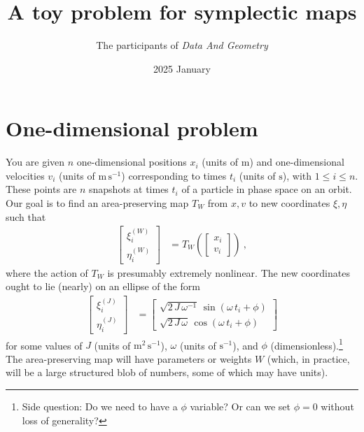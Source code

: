 \documentclass{article}
\title{\bfseries%
A toy problem for symplectic maps}
\author{The participants of \textsl{Data And Geometry}}
\date{2025 January}
\newcommand{\unit}[1]{\mathrm{#1}}
\newcommand{\m}{\unit{m}}
\newcommand{\s}{\unit{s}}
\newcommand{\ps}{\s^{-1}}
\newcommand{\mps}{\m\,\ps}
\newcommand{\mmps}{\m^2\,\ps}
\begin{document}
\maketitle

\section{One-dimensional problem}
You are given $n$ one-dimensional positions $x_i$ (units of $\m$) and one-dimensional velocities $v_i$ (units of $\mps$) corresponding to times $t_i$ (units of $\s$), with $1\leq i\leq n$.
These points are $n$ snapshots at times $t_i$ of a particle in phase space on an orbit.
Our goal is to find an area-preserving map $T_W$ from $x, v$ to new coordinates $\xi, \eta$ such that
\begin{align}
    \begin{bmatrix}\xi^{(W)}_i \\ \eta^{(W)}_i\end{bmatrix} &= T_W\left(\begin{bmatrix}x_i \\ v_i\end{bmatrix}\right) ~,
\end{align}
where the action of $T_W$ is presumably extremely nonlinear.
The new coordinates ought to lie (nearly) on an ellipse of the form
\begin{align}
    \begin{bmatrix}\xi^{(J)}_i \\ \eta^{(J)}_i\end{bmatrix} &= \begin{bmatrix}\sqrt{2\,J\,\omega^{-1}}\,\sin(\omega\,t_i+\phi) \\ \sqrt{2\,J\,\omega}\,\cos(\omega\,t_i+\phi)\end{bmatrix}
\end{align}
for some values of $J$ (units of $\mmps$), $\omega$ (units of $\ps$), and $\phi$ (dimensionless).\footnote{Side question: Do we need to have a $\phi$ variable? Or can we set $\phi=0$ without loss of generality?}
The area-preserving map will have parameters or weights $W$ (which, in practice, will be a large structured blob of numbers, some of which may have units).
\end{document}
